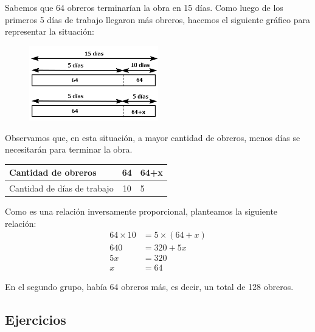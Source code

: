 \documentclass[11pt]{book}
\begin{document}
Sabemos que 64 obreros terminarían la obra en 15 días. Como luego de los primeros 5 días de trabajo llegaron más obreros, hacemos el siguiente gráfico para representar la situación:
\begin{figure}[H]
  \centering
  \includegraphics[width=0.5\textwidth]{./Unidad 2/Images/tableS8L103.png}
\end{figure}
Observamos que, en esta situación, a mayor cantidad de obreros, menos días se necesitarán para terminar la obra.\\

\begin{table}[H]
  \centering
  \begin{tabular}{|l|c|l|}
    \hline
    Cantidad de obreros         & 64 & 64+x \\
    \hline
    Cantidad de días de trabajo & 10 & 5    \\
    \hline
  \end{tabular}
\end{table}

Como es una relación inversamente proporcional, planteamos la siguiente relación:
\begin{align*}
  64 \times 10 & = 5 \times (64+x) \\
  640          & = 320 +5x         \\
  5x           & = 320             \\
  x            & = 64
\end{align*}

En el segundo grupo, había 64 obreros más, es decir, un total de 128 obreros.






\subsection*{Ejercicios}
\end{document}
